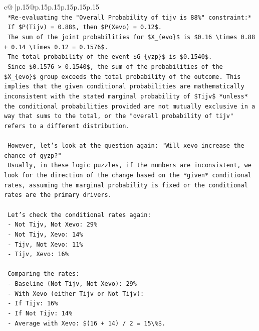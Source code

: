 \documentclass{article}
\begin{document}
{\begin{supertabular}{c@{$\;$}|p{.15\linewidth}@{}p{.15\linewidth}p{.15\linewidth}p{.15\linewidth}p{.15\linewidth}p{.15\linewidth}}
{{{\\ 
\texttt{    *Re{-}evaluating the "Overall Probability of tijv is 88\%" constraint:*} \\
\texttt{    If \$P(Tijv) = 0.88\$, then \$P(Xevo) = 0.12\$.} \\
\texttt{    The sum of the joint probabilities for \$X\_\{evo\}\$ is \$0.16 \textbackslash{}times 0.88 + 0.14 \textbackslash{}times 0.12 = 0.1576\$.} \\
\texttt{    The total probability of the event \$G\_\{yzp\}\$ is \$0.1540\$.} \\
\texttt{    Since \$0.1576 > 0.1540\$, the sum of the probabilities of the \$X\_\{evo\}\$ group exceeds the total probability of the outcome. This implies that the given conditional probabilities are mathematically inconsistent with the stated marginal probability of \$Tijv\$ *unless* the conditional probabilities provided are not mutually exclusive in a way that sums to the total, or the "overall probability of tijv" refers to a different distribution.} \\
\\ 
\texttt{    However, let's look at the question again: "Will xevo increase the chance of gyzp?"} \\
\texttt{    Usually, in these logic puzzles, if the numbers are inconsistent, we look for the direction of the change based on the *given* conditional rates, assuming the marginal probability is fixed or the conditional rates are the primary drivers.} \\
\\ 
\texttt{    Let's check the conditional rates again:} \\
\texttt{    {-} Not Tijv, Not Xevo: 29\%} \\
\texttt{    {-} Not Tijv, Xevo: 14\%} \\
\texttt{    {-} Tijv, Not Xevo: 11\%} \\
\texttt{    {-} Tijv, Xevo: 16\%} \\
\\ 
\texttt{    Comparing the rates:} \\
\texttt{    {-} Baseline (Not Tijv, Not Xevo): 29\%} \\
\texttt{    {-} With Xevo (either Tijv or Not Tijv):} \\
\texttt{        {-} If Tijv: 16\%} \\
\texttt{        {-} If Not Tijv: 14\%} \\
\texttt{    {-} Average with Xevo: \$(16 + 14) / 2 = 15\textbackslash{}\%\$.} \\
}}}
\end{supertabular}}
\end{document}
